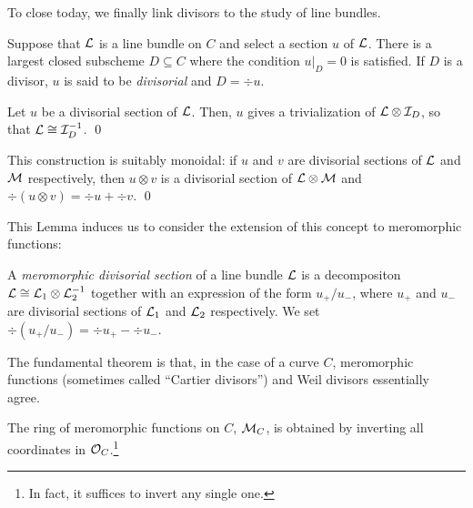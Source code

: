 To close today, we finally link divisors to the study of line bundles.

\begin{definition}
Suppose that $\mathcal{L}$ is a line bundle on $C$ and select a section $u$ of $\mathcal{L}$.  There is a largest closed subscheme $D \subseteq C$ where the condition $u|_D = 0$ is satisfied.  If $D$ is a divisor, $u$ is said to be \textit{divisorial} and $D = \div u$.
\end{definition}

\begin{lemma}
Let $u$ be a divisorial section of $\mathcal{L}$.  Then, $u$ gives a trivialization of $\mathcal{L} \otimes \mathcal{I}_D$, so that $\mathcal{L} \cong \mathcal{I}_D^{-1}$. \qed
\end{lemma}

\begin{lemma}
This construction is suitably monoidal: if $u$ and $v$ are divisorial sections of $\mathcal{L}$ and $\mathcal{M}$ respectively, then $u \otimes v$ is a divisorial section of $\mathcal{L} \otimes \mathcal{M}$ and $\div(u \otimes v) = \div u + \div v$. \qed
\end{lemma}

This Lemma induces us to consider the extension of this concept to meromorphic functions:
\begin{definition}
A \textit{meromorphic divisorial section} of a line bundle $\mathcal{L}$ is a decompositon $\mathcal{L} \cong \mathcal{L}_1 \otimes \mathcal{L}_2^{-1}$ together with an expression of the form $u_+ / u_-$, where $u_+$ and $u_-$ are divisorial sections of $\mathcal{L}_1$ and $\mathcal{L}_2$ respectively.  We set $\div(u_+ / u_-) = \div u_+ - \div u_-$.
\end{definition}

The fundamental theorem is that, in the case of a curve $C$, meromorphic functions (sometimes called ``Cartier divisors'') and Weil divisors essentially agree.

\begin{definition}
The ring of meromorphic functions on $C$, $\mathcal{M}_C$, is obtained by inverting all coordinates in $\mathcal{O}_C$.\footnote{In fact, it suffices to invert any single one.}
\end{definition}

